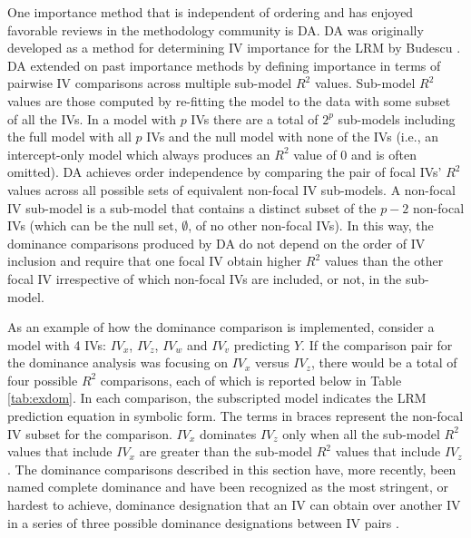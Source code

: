 \documentclass[ShortAfour,times,sageapa]{sagej}
\begin{document}
	One importance method that is independent of ordering and has enjoyed favorable reviews in the methodology community is DA.
	DA was originally developed as a method for determining IV importance for the LRM by Budescu \citeyear{budescu1993dominance}.
	DA extended on past importance methods by defining importance in terms of pairwise IV comparisons across multiple sub-model $R^2$ values.
	Sub-model $R^2$ values are those computed by re-fitting the model to the data with some subset of all the IVs.
	In a model with $p$ IVs there are a total of $2^p$ sub-models including the full model with all $p$ IVs and the null model with none of the IVs (i.e., an intercept-only model which always produces an $R^2$ value of 0 and is often omitted).
	DA achieves order independence by comparing the pair of focal IVs' $R^2$ values across all possible sets of equivalent non-focal IV sub-models. 
	A non-focal IV sub-model is a sub-model that contains a distinct subset of the $p - 2$ non-focal IVs (which can be the null set, $\emptyset$, of no other non-focal IVs).	
	In this way, the dominance comparisons produced by DA do not depend on the order of IV inclusion and require that one focal IV obtain higher $R^2$ values than the other focal IV irrespective of which non-focal IVs are included, or not, in the sub-model.
	
	As an example of how the dominance comparison is implemented, consider a model with 4 IVs: $IV_x$, $IV_z$, $IV_w$ and $IV_v$ predicting $Y$.
	If the comparison pair for the dominance analysis was focusing on $IV_x$ versus $IV_z$, there would be a total of four possible $R^2$ comparisons, each of which is reported below in Table \ref{tab:exdom}.
	In each comparison, the subscripted model indicates the LRM prediction equation in symbolic form.
	The terms in braces represent the non-focal IV subset for the comparison.
	$IV_x$ dominates $IV_z$ only when all the sub-model $R^2$ values that include $IV_x$ are greater than the sub-model $R^2$ values that include $IV_z$.
	The dominance comparisons described in this section have, more recently, been named complete dominance and have been recognized as the most stringent, or hardest to achieve, dominance designation that an IV can obtain over another IV in a series of three possible dominance designations between IV pairs \cite{azen2003dominance}.	
\end{document}

